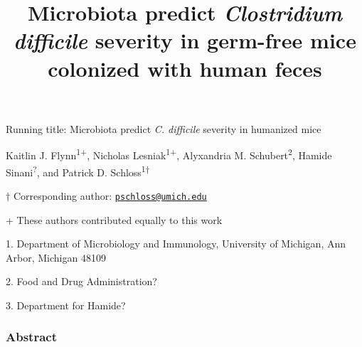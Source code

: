 \documentclass[11pt,]{article}
\title{\textbf{Microbiota predict \emph{Clostridium difficile} severity in
germ-free mice colonized with human feces}}
\author{}
\date{}
\begin{document}
\maketitle


\vspace{35mm}

Running title: Microbiota predict \emph{C. difficile} severity in
humanized mice

\vspace{35mm}

Kaitlin J. Flynn\textsuperscript{1+}, Nicholas
Lesniak\textsuperscript{1+}, Alyxandria M. Schubert\textsuperscript{2},
Hamide Sinani\textsuperscript{?}, and Patrick D.
Schloss\textsuperscript{1\(\dagger\)}

\vspace{40mm}

\(\dagger\) Corresponding author:
\href{mailto:pschloss@umich.edu}{\nolinkurl{pschloss@umich.edu}}

+ These authors contributed equally to this work

1. Department of Microbiology and Immunology, University of Michigan,
Ann Arbor, Michigan 48109

2. Food and Drug Administration?

3. Department for Hamide?

\newpage
\linenumbers

\subsubsection{Abstract}\label{abstract}
\end{document}
